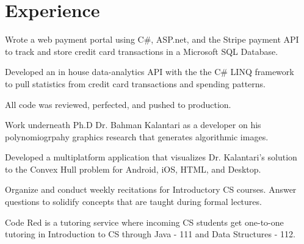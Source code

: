 \documentclass[]{deedy-resume-openfont}
\begin{document}
\begin{minipage}[t]{0.33\textwidth}
\sectionsep


%
%

\end{minipage} 
\hfill
\begin{minipage}[t]{0.66\textwidth} 


\section{Experience}

\vspace{\topsep} %
\begin{tightemize}
\item Wrote a web payment portal using C\#, ASP.net, and the Stripe payment API \\to track and store credit card transactions in a Microsoft SQL Database.
\item Developed an in house data-analytics API with the the C\# LINQ framework \\to pull statistics from credit card transactions and spending patterns. 
\item All code was reviewed, perfected, and pushed to production.
\end{tightemize}
\sectionsep

\begin{tightemize}
\item Work underneath Ph.D Dr. Bahman Kalantari as a developer on his polynomiogrpahy graphics research that generates algorithmic images.  
\item Developed a multiplatform application that visualizes Dr. Kalantari's solution \\ to the Convex Hull problem for Android, iOS, HTML, and Desktop. 
\end{tightemize}
\sectionsep

\begin{tightemize}
\item Organize and conduct weekly recitations for Introductory CS courses. Answer questions to solidify concepts that are taught during formal lectures. 
\item Code Red is a tutoring service where incoming CS students get one-to-one tutoring in Introduction to CS through Java - 111 and Data Structures - 112. 
\end{tightemize}
\sectionsep


\end{minipage}
\end{document}
